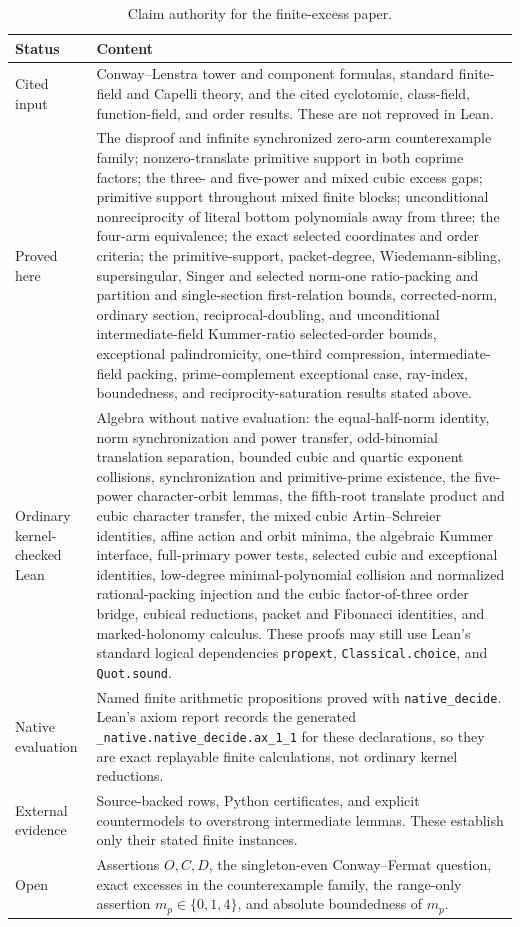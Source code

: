 \documentclass[11pt]{article}
\theoremstyle{definition}
\theoremstyle{remark}
\begin{document}
\begin{table}[ht]
\centering
\small
\begin{tabular}{p{}p{}}
\hline
Status & Content \\
\hline
Cited input & Conway--Lenstra tower and component formulas, standard finite-field and
Capelli theory, and the cited cyclotomic, class-field, function-field, and
order results.  These are not reproved in Lean. \\
Proved here & The disproof and infinite synchronized
zero-arm counterexample family; nonzero-translate primitive support in both coprime factors; the three- and five-power and mixed cubic excess gaps;
primitive support throughout mixed finite blocks; unconditional nonreciprocity of literal bottom polynomials away from three; the four-arm equivalence; the exact selected coordinates and
order criteria; the primitive-support, packet-degree, Wiedemann-sibling,
supersingular, Singer
and selected norm-one ratio-packing and partition and single-section first-relation bounds,
corrected-norm, ordinary section, reciprocal-doubling, and unconditional
intermediate-field Kummer-ratio selected-order bounds,
exceptional palindromicity, one-third compression, intermediate-field packing,
prime-complement exceptional case, ray-index, boundedness, and
reciprocity-saturation results stated above. \\
Ordinary kernel-checked Lean & Algebra without native evaluation: the
equal-half-norm identity, norm synchronization and power transfer, odd-binomial translation
separation, bounded cubic and quartic exponent collisions, synchronization and primitive-prime existence, the five-power character-orbit lemmas,
the fifth-root translate product and cubic character transfer,
the mixed cubic Artin--Schreier identities, affine action and orbit minima,
the algebraic Kummer interface, full-primary
power tests, selected cubic and
exceptional identities, low-degree minimal-polynomial collision and
normalized rational-packing injection and the cubic factor-of-three
order bridge, cubical
reductions, packet and Fibonacci identities, and marked-holonomy calculus.
These proofs may still use Lean's standard
logical dependencies \texttt{propext}, \texttt{Classical.choice}, and
\texttt{Quot.sound}. \\
Native evaluation & Named finite arithmetic propositions proved
with \texttt{native\_decide}.  Lean's axiom report records the generated
\texttt{\_native.native\_decide.ax\_1\_1} for these declarations, so they
are exact replayable finite calculations, not ordinary kernel reductions. \\
External evidence & Source-backed rows, Python certificates, and
explicit countermodels to overstrong intermediate lemmas.  These establish
only their stated finite instances. \\
Open & Assertions $O,C,D$, the singleton-even Conway--Fermat question,
exact excesses in the counterexample family, the range-only assertion
$m_p\in\{0,1,4\}$, and absolute boundedness of $m_p$. \\
\hline
\end{tabular}
\caption{Claim authority for the finite-excess paper.}
\label{tab:status}
\end{table}
\end{document}

